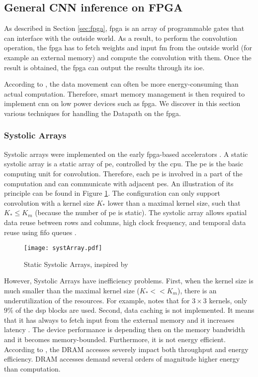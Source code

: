 \subsection{General CNN inference on FPGA} \label{sec:dt_general}
%
As described in Section \ref{sec:fpga}, \acrshort{fpga} is an array of programmable gates that can interface with the outside world. As a result, to perform the convolution operation, the \acrshort{fpga} has to fetch weights and input \acrshort{fm} from the outside world (for example an external memory) and compute the convolution with them. Once the result is obtained, the \acrshort{fpga} can output the results through its \acrshort{ioe}.

According to \textcite{chen_eyeriss_2017}, the data movement can often be more energy-consuming than actual computation. Therefore, smart memory management is then required to implement \acrshort{cnn} on low power devices such as \acrshort{fpga}. We discover in this section various techniques for handling the Datapath on the \acrshort{fpga}.

\subsubsection{Systolic Arrays}
%
%
Systolic arrays were implemented on the early \acrshort{fpga}-based accelerators \cite{abdelouahab_accelerating_2018, farabet_cnp_2009, gokhale_240_2014}. A static systolic array is a static array of \acrfull{pe}, controlled by the \acrshort{cpu}. The \acrshort{pe} is the basic computing unit for convolution. Therefore, each \acrshort{pe} is involved in a part of the computation and can communicate with adjacent \acrshort{pe}s. An illustration of its principle can be found in Figure \ref{fig:sytar}. The configuration can only support convolution with a kernel size $K_*$ lower than a maximal kernel size, such that $K_* \leq K_m$ (because the number of \acrshort{pe} is static). The systolic array allows spatial data reuse between rows and columns, high clock frequency, and temporal data reuse using \acrshort{fifo} queues \cite{joos_de_ter_beerst_accelerating_2019, mittal_survey_2020}.
%
\begin{figure}[H]
    \centering
    \texttt{[image: systArray.pdf]}
    \caption{Static Systolic Arrays, inspired by \cite{abdelouahab_accelerating_2018}}
    \label{fig:sytar}
\end{figure}

However, Systolic Arrays have inefficiency problems. First, when the kernel size is much smaller than the maximal kernel size ($K_* << K_m$), there is an underutilization of the resources. For example, \cite{gokhale_240_2014} notes that for $3 \times 3$ kernels, only $9\%$ of the \acrfull{dsp} blocks are used. Second, data caching is not implemented. It means that it has always to fetch input from the external memory and it increases latency \cite{abdelouahab_accelerating_2018, wei_automated_2017}. The device performance is depending then on the memory bandwidth and it becomes memory-bounded. Furthermore, it is not energy efficient. According to \textcite{horowitz_11_2014}, the DRAM accesses severely impact both throughput and energy efficiency. DRAM accesses demand several orders of magnitude higher energy than computation.
%
%
